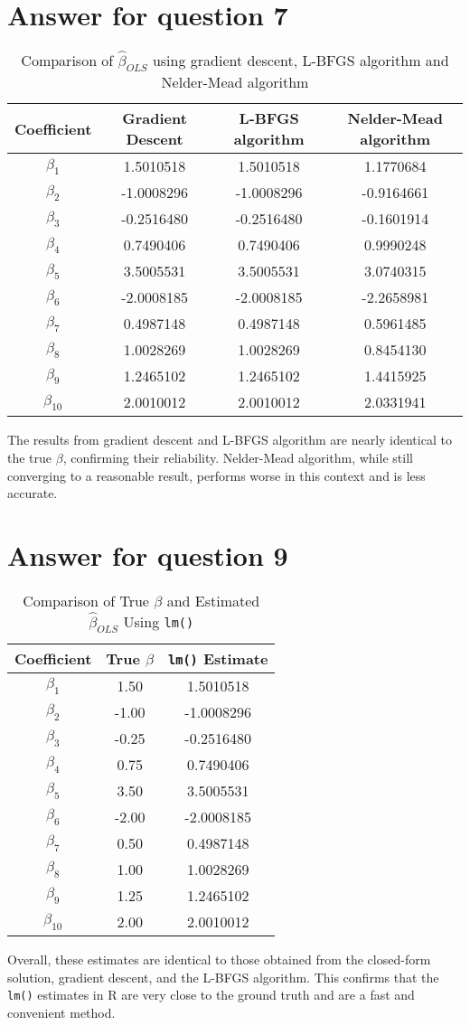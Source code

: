 \documentclass{article}
\begin{document}
\section{Answer for question 7}
\begin{table}[H]
\centering
\caption{Comparison of $\hat{\beta}_{OLS}$ using gradient descent, L-BFGS algorithm and Nelder-Mead algorithm}
\begin{tabular}{|c|c|c|c|}
\hline
\textbf{Coefficient} & \textbf{Gradient Descent} & \textbf{L-BFGS algorithm} & \textbf{Nelder-Mead algorithm} \\
\hline
$\beta_1$ & 1.5010518 & 1.5010518 & 1.1770684 \\
$\beta_2$ & -1.0008296 & -1.0008296 & -0.9164661 \\
$\beta_3$ & -0.2516480 & -0.2516480 & -0.1601914 \\
$\beta_4$ & 0.7490406 & 0.7490406 & 0.9990248 \\
$\beta_5$ & 3.5005531 & 3.5005531 & 3.0740315 \\
$\beta_6$ & -2.0008185 & -2.0008185 & -2.2658981 \\
$\beta_7$ & 0.4987148 & 0.4987148 & 0.5961485 \\
$\beta_8$ & 1.0028269 & 1.0028269 & 0.8454130 \\
$\beta_9$ & 1.2465102 & 1.2465102 & 1.4415925 \\
$\beta_{10}$ & 2.0010012 & 2.0010012 & 2.0331941 \\
\hline
\end{tabular}
\end{table}
The results from gradient descent and L-BFGS algorithm are nearly identical to the true $\beta$, confirming their reliability. Nelder-Mead algorithm, while still converging to a reasonable result, performs worse in this context and is less accurate.

\section{Answer for question 9}
\begin{table}[H]
\centering
\caption{Comparison of True $\beta$ and Estimated $\hat{\beta}_{OLS}$ Using \texttt{lm()}}
\begin{tabular}{|c|c|c|}
\hline
\textbf{Coefficient} & \textbf{True $\beta$} & \texttt{lm()} Estimate \\
\hline
$\beta_1$ & 1.50  & 1.5010518 \\
$\beta_2$ & -1.00 & -1.0008296 \\
$\beta_3$ & -0.25 & -0.2516480 \\
$\beta_4$ & 0.75  & 0.7490406 \\
$\beta_5$ & 3.50  & 3.5005531 \\
$\beta_6$ & -2.00 & -2.0008185 \\
$\beta_7$ & 0.50  & 0.4987148 \\
$\beta_8$ & 1.00  & 1.0028269  \\
$\beta_9$ & 1.25  & 1.2465102 \\
$\beta_{10}$ & 2.00 & 2.0010012 \\
\hline
\end{tabular}
\end{table}

Overall, these estimates are identical to those obtained from the closed-form solution, gradient descent, and the L-BFGS algorithm. This confirms that the \texttt{lm()} estimates in R are very close to the ground truth and are a fast and convenient method.
\end{document}

